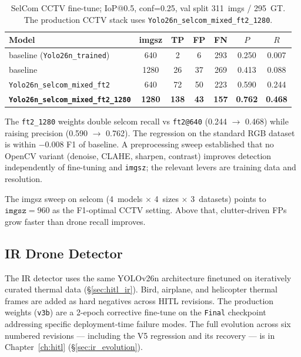\begin{table}[htbp]
    \centering
    \caption{SelCom CCTV fine-tune; IoP@0.5, conf=0.25, val split 311~imgs / 295~GT. The production CCTV stack uses \texttt{Yolo26n\_selcom\_mixed\_ft2\_1280}.}
    \label{tab:selcom}
    \begin{tabular}{lcccccc}
        \toprule
        Model & imgsz & TP & FP & FN & $P$ & $R$ \\
        \midrule
        baseline (\texttt{Yolo26n\_trained})        & 640  &   2 &  6 & 293 & 0.250 & 0.007 \\
        baseline                                    & 1280 &  26 & 37 & 269 & 0.413 & 0.088 \\
        \texttt{Yolo26n\_selcom\_mixed\_ft2}        & 640  &  72 & 50 & 223 & 0.590 & 0.244 \\
        \textbf{\texttt{Yolo26n\_selcom\_mixed\_ft2\_1280}} & \textbf{1280} & \textbf{138} & \textbf{43} & \textbf{157} & \textbf{0.762} & \textbf{0.468} \\
        \bottomrule
    \end{tabular}
\end{table}

The \texttt{ft2\_1280} weights double selcom recall vs \texttt{ft2@640} (0.244 $\to$ 0.468) while raising precision (0.590 $\to$ 0.762). The regression on the standard RGB dataset is within $-0.008$ F1 of baseline. A preprocessing sweep established that no OpenCV variant (denoise, CLAHE, sharpen, contrast) improves detection independently of fine-tuning and \texttt{imgsz}; the relevant levers are training data and resolution.

The imgsz sweep on selcom (4~models $\times$ 4~sizes $\times$ 3~datasets) points to $\mathtt{imgsz}=960$ as the F1-optimal CCTV setting. Above that, clutter-driven FPs grow faster than drone recall improves.

\subsection{IR Drone Detector}
\label{sec:ir_detector}

The IR detector uses the same YOLOv26n architecture finetuned on iteratively curated thermal data (\S\ref{sec:hitl_ir}). Bird, airplane, and helicopter thermal frames are added as hard negatives across HITL revisions. The production weights (\texttt{v3b}) are a 2-epoch corrective fine-tune on the \texttt{Final} checkpoint addressing specific deployment-time failure modes. The full evolution across six numbered revisions --- including the V5 regression and its recovery --- is in Chapter~\ref{ch:hitl} (\S\ref{sec:ir_evolution}).

